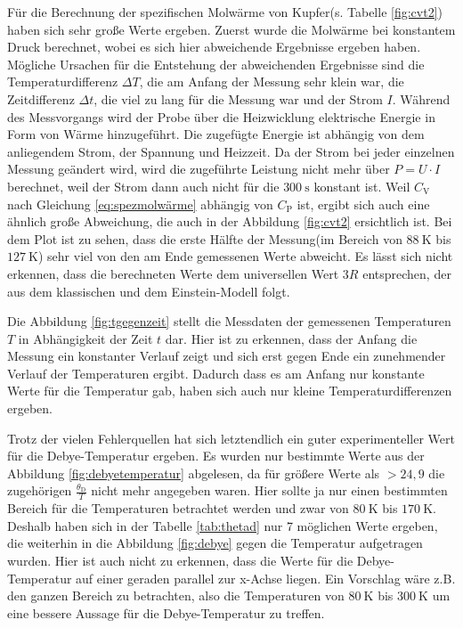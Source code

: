 Für die Berechnung der spezifischen Molwärme von Kupfer(s. Tabelle \ref{fig:cvt2}) haben sich sehr große Werte ergeben. Zuerst wurde die Molwärme bei konstantem Druck berechnet, wobei es sich hier abweichende Ergebnisse ergeben haben. Mögliche Ursachen für die Entstehung der abweichenden Ergebnisse sind die Temperaturdifferenz $\Delta T$, die am Anfang der Messung sehr klein war, die Zeitdifferenz $\Delta t$, die viel zu lang für die Messung war und der Strom $I$. Während des Messvorgangs wird der Probe über die Heizwicklung elektrische Energie in Form von Wärme hinzugeführt. Die zugefügte Energie ist abhängig von dem anliegendem Strom, der Spannung und Heizzeit. Da der Strom bei jeder einzelnen Messung geändert wird, wird die zugeführte Leistung nicht mehr über $P = U \cdot I$ berechnet, weil der Strom dann auch nicht für die $\SI{300}{\second}$ konstant ist. Weil $C_\text{V}$ nach Gleichung \ref{eq:spezmolwärme} abhängig von $C_\text{P}$ ist, ergibt sich auch eine ähnlich große Abweichung, die auch in der Abbildung \ref{fig:cvt2} ersichtlich ist. Bei dem Plot ist zu sehen, dass die erste Hälfte der Messung(im Bereich von $\SI{88}{\kelvin}$ bis $\SI{127}{\kelvin}$) sehr viel von den am Ende gemessenen Werte abweicht. Es lässt sich nicht erkennen, dass die berechneten Werte dem universellen Wert $3R$ entsprechen, der aus dem klassischen und dem Einstein-Modell folgt.
 
Die Abbildung \ref{fig:tgegenzeit} stellt die Messdaten der gemessenen Temperaturen $T$ in Abhängigkeit der Zeit $t$ dar. Hier ist zu erkennen, dass der Anfang die Messung ein konstanter Verlauf zeigt und sich erst gegen Ende ein zunehmender Verlauf der Temperaturen ergibt. Dadurch dass es am Anfang nur konstante Werte für die Temperatur gab, haben sich auch nur kleine Temperaturdifferenzen ergeben. 

Trotz der vielen Fehlerquellen hat sich letztendlich ein guter experimenteller Wert für die Debye-Temperatur ergeben. Es wurden nur bestimmte Werte aus der Abbildung \ref{fig:debyetemperatur} abgelesen, da für größere Werte als $> 24,9$ die zugehörigen $\frac{\theta_\text{D}}{T}$ nicht mehr angegeben waren. Hier sollte ja nur einen bestimmten Bereich für die Temperaturen betrachtet werden und zwar von $\SI{80}{\kelvin}$ bis $\SI{170}{\kelvin}$. Deshalb haben sich in der Tabelle \ref{tab:thetad} nur 7 möglichen Werte ergeben, die weiterhin in die Abbildung \ref{fig:debye} gegen die Temperatur aufgetragen wurden. Hier ist auch nicht zu erkennen, dass die Werte für die Debye-Temperatur auf einer geraden parallel zur x-Achse liegen. Ein Vorschlag wäre z.B. den ganzen Bereich zu betrachten, also die Temperaturen von $\SI{80}{\kelvin}$ bis $\SI{300}{\kelvin}$ um eine bessere Aussage für die Debye-Temperatur zu treffen.

